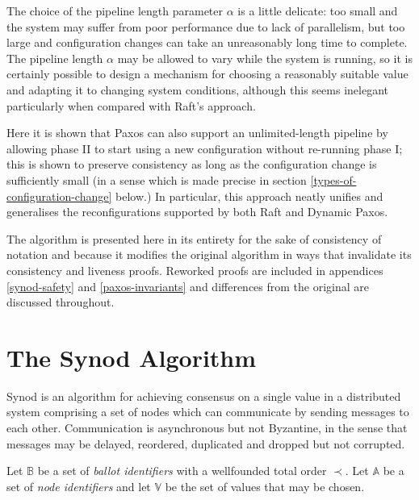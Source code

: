\documentclass[journal]{IEEEtran}
\begin{document}
The choice of the pipeline length parameter $\alpha$ is a little delicate: too
small and the system may suffer from poor performance due to lack of
parallelism, but too large and configuration changes can take an unreasonably
long time to complete. The pipeline length $\alpha$ may be allowed to vary
while the system is running, so it is certainly possible to design a mechanism
for choosing a reasonably suitable value and adapting it to changing system
conditions, although this seems inelegant\cite{reconfiguring-a-state-machine}
particularly when compared with Raft's approach.

Here it is shown that Paxos can also support an unlimited-length pipeline by
allowing phase II to start using a new configuration without re-running phase
I; this is shown to preserve consistency as long as the configuration change is
sufficiently small (in a sense which is made precise in section
\ref{types-of-configuration-change} below.) In particular, this approach neatly
unifies and generalises the reconfigurations supported by both Raft and Dynamic
Paxos.

The algorithm is presented here in its entirety for the sake of consistency of
notation and because it modifies the original algorithm in ways that invalidate
its consistency and liveness proofs. Reworked proofs are included in appendices
\ref{synod-safety} and \ref{paxos-invariants} and differences from the original
are discussed throughout.

\section{The Synod Algorithm}

Synod\cite{part-time-parliament} is an algorithm for achieving consensus on a
single value in a distributed system comprising a set of nodes which can
communicate by sending messages to each other. Communication is asynchronous
but not Byzantine, in the sense that messages may be delayed, reordered,
duplicated and dropped but not corrupted.

Let $\mathbb B$ be a set of \textit{ballot identifiers} with a wellfounded
total order $\prec$. Let $\mathbb A$ be a set of \textit{node identifiers} and
let $\mathbb V$ be the set of values that may be chosen.

\def\prep#1{\mathbf{prepare}(#1)}
\def\mprom#1#2#3{\mathbf{promised}_{\ge #1}(#2,#3)}
\def\fprom#1#2#3{\mathbf{promised}_{#1}(#2,#3)}
\def\bprom#1#2#3#4{\mathbf{promised}_{#1}(#2,#3;#4)}
\def\prop#1#2{\mathbf{proposed}_{#1}(#2)}
\def\acc#1#2#3{\mathbf{accepted}_{#1}(#2,#3)}
\def\chosen#1#2{\mathbf{chosen}_{#1}(#2)}
\def\owner#1{\mathrm{owner}(#1)}
\end{document}
